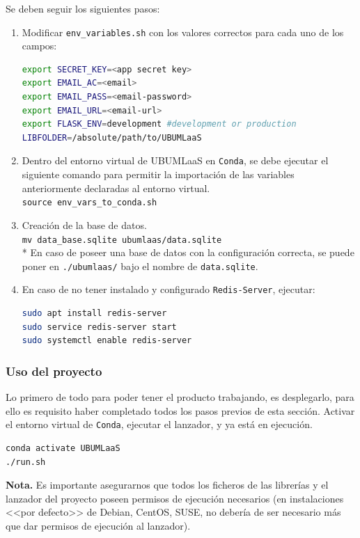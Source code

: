 Se deben seguir los siguientes pasos:
\begin{enumerate}
\item Modificar \texttt{env\_variables.sh} con los valores correctos para cada uno de los campos:
\begin{lstlisting}[language=bash]
export SECRET_KEY=<app secret key>
export EMAIL_AC=<email>
export EMAIL_PASS=<email-password>
export EMAIL_URL=<email-url>
export FLASK_ENV=development #development or production
LIBFOLDER=/absolute/path/to/UBUMLaaS
\end{lstlisting}
\item Dentro del entorno virtual de UBUMLaaS en \texttt{Conda}, se debe ejecutar el siguiente comando para permitir la importación de las variables anteriormente declaradas al entorno virtual.\\
\texttt{source env\_vars\_to\_conda.sh}
\item Creación de la base de datos.\\
\texttt{mv data\_base.sqlite ubumlaas/data.sqlite}\\
* En caso de poseer una base de datos con la configuración correcta, se puede poner en \texttt{./ubumlaas/} bajo el nombre de \texttt{data.sqlite}.
\item En caso de no tener instalado y configurado \texttt{Redis-Server}, ejecutar:
\begin{lstlisting}[language=bash]
sudo apt install redis-server
sudo service redis-server start
sudo systemctl enable redis-server
\end{lstlisting}
\end{enumerate}

\subsubsection{Uso del proyecto}
Lo primero de todo para poder tener el producto trabajando, es desplegarlo, para ello es requisito haber completado todos los pasos previos de esta sección. Activar el entorno virtual de \texttt{Conda}, ejecutar el lanzador, y ya está en ejecución.
\begin{lstlisting}[language=bash]
conda activate UBUMLaaS
./run.sh
\end{lstlisting}
\textbf{Nota.} Es importante asegurarnos que todos los ficheros de las librerías y el lanzador del proyecto poseen permisos de ejecución necesarios (en instalaciones <<por defecto>> de Debian, CentOS, SUSE, no debería de ser necesario más que dar permisos de ejecución al lanzador).

